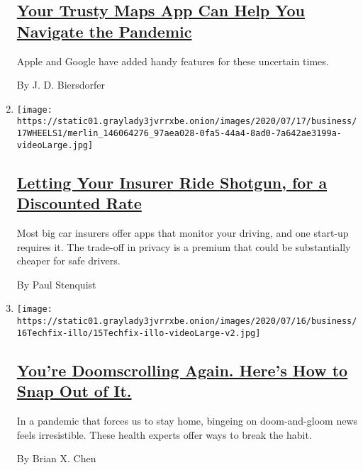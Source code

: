 \begin{enumerate}
  \hypertarget{your-trusty-maps-app-can-help-you-navigate-the-pandemic}{%
  \subsection{\texorpdfstring{\href{/2020/07/22/technology/personaltech/maps-apps-coronavirus-pandemic.html}{Your
  Trusty Maps App Can Help You Navigate the
  Pandemic}}{Your Trusty Maps App Can Help You Navigate the Pandemic}}\label{your-trusty-maps-app-can-help-you-navigate-the-pandemic}}

  Apple and Google have added handy features for these uncertain times.

  By J. D. Biersdorfer
\item
  \texttt{[image: https://static01.graylady3jvrrxbe.onion/images/2020/07/17/business/17WHEELS1/merlin\_146064276\_97aea028-0fa5-44a4-8ad0-7a642ae3199a-videoLarge.jpg]}

  \hypertarget{letting-your-insurer-ride-shotgun-for-a-discounted-rate}{%
  \subsection{\texorpdfstring{\href{/2020/07/16/business/car-insurance-app-discounts.html}{Letting
  Your Insurer Ride Shotgun, for a Discounted
  Rate}}{Letting Your Insurer Ride Shotgun, for a Discounted Rate}}\label{letting-your-insurer-ride-shotgun-for-a-discounted-rate}}

  Most big car insurers offer apps that monitor your driving, and one
  start-up requires it. The trade-off in privacy is a premium that could
  be substantially cheaper for safe drivers.

  By Paul Stenquist
\item
  \texttt{[image: https://static01.graylady3jvrrxbe.onion/images/2020/07/16/business/16Techfix-illo/15Techfix-illo-videoLarge-v2.jpg]}

  \hypertarget{youre-doomscrolling-again-heres-how-to-snap-out-of-it}{%
  \subsection{\texorpdfstring{\href{/2020/07/15/technology/personaltech/youre-doomscrolling-again-heres-how-to-snap-out-of-it.html}{You're
  Doomscrolling Again. Here's How to Snap Out of
  It.}}{You're Doomscrolling Again. Here's How to Snap Out of It.}}\label{youre-doomscrolling-again-heres-how-to-snap-out-of-it}}

  In a pandemic that forces us to stay home, bingeing on doom-and-gloom
  news feels irresistible. These health experts offer ways to break the
  habit.

  By Brian X. Chen
\end{enumerate}

